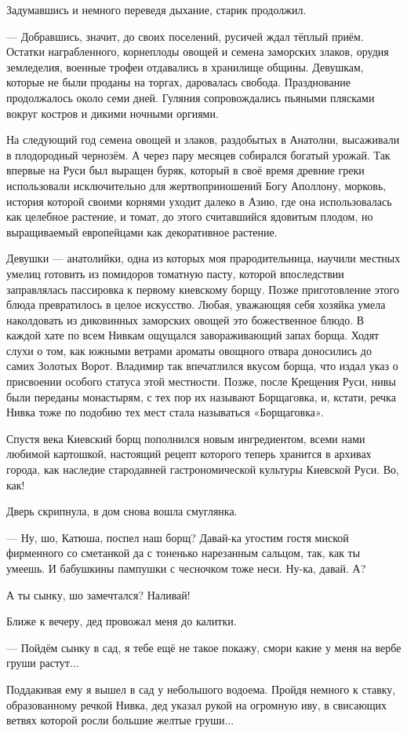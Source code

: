Задумавшись и немного переведя дыхание, старик продолжил.

— Добравшись, значит, до своих поселений, русичей ждал тёплый приём. Остатки
награбленного, корнеплоды овощей и семена заморских злаков, орудия земледелия,
военные трофеи отдавались в хранилище общины. Девушкам, которые не были проданы
на торгах, даровалась свобода. Празднование продолжалось около семи дней.
Гуляния сопровождались пьяными плясками вокруг костров и дикими ночными
оргиями.

На следующий год семена овощей и злаков, раздобытых в Анатолии,
высаживали в плодородный чернозём. А через пару месяцев собирался богатый
урожай. Так впервые на Руси был выращен буряк, который в своё время
древние греки использовали исключительно для жертвоприношений Богу
Аполлону, морковь, история которой своими корнями уходит далеко в Азию,
где она использовалась как целебное растение, и томат, до этого
считавшийся ядовитым плодом, но выращиваемый европейцами как декоративное
растение.

Девушки — анатолийки, одна из которых моя прародительница, научили
местных умелиц готовить из помидоров томатную пасту, которой впоследствии
заправлялась пассировка к первому киевскому борщу. Позже приготовление
этого блюда превратилось в целое искусство. Любая, уважающяя себя хозяйка
умела наколдовать из диковинных заморских овощей это божественное блюдо.
В каждой хате по всем Нивкам ощущался завораживающий запах борща. Ходят
слухи о том, как южными ветрами ароматы овощного отвара доносились до
самих Золотых Ворот. Владимир так впечатлился вкусом борща, что издал
указ о присвоении особого статуса этой местности. Позже, после Крещения
Руси, нивы были переданы монастырям, с тех пор их называют Борщаговка, и,
кстати, речка Нивка тоже по подобию тех мест стала называться
«Борщаговка».

Спустя века Киевский борщ пополнился новым ингредиентом, всеми нами любимой
картошкой, настоящий рецепт которого теперь хранится в архивах города, как
наследие стародавней гастрономической культуры Киевской Руси. Во, как!

Дверь скрипнула, в дом снова вошла смуглянка.

— Ну, шо, Катюша, поспел наш борщ? Давай-ка угостим гостя миской фирменного со
сметанкой да с тоненько нарезанным сальцом, так, как ты умеешь. И бабушкины
пампушки с чесночком тоже неси. Ну-ка, давай. А?

А ты сынку, шо замечтался?  Наливай!

Ближе к вечеру, дед провожал меня до калитки.

— Пойдём сынку в сад, я тебе ещё не такое покажу, смори какие у меня на вербе
груши растут...

Поддакивая ему я вышел в сад у небольшого водоема. Пройдя немного к ставку,
образованному речкой Нивка, дед указал рукой на огромную иву, в свисающих
ветвях которой росли большие желтые груши...

